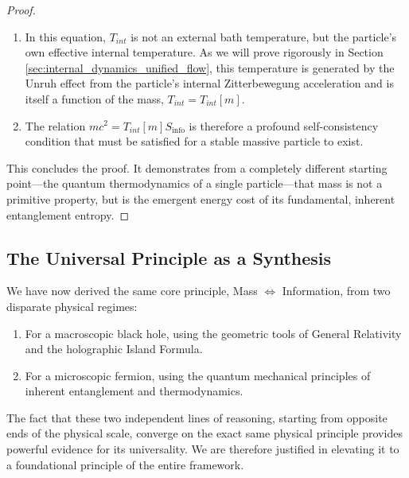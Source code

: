 \documentclass[11pt, letterpaper]{report}
\theoremstyle{plain} %
\theoremstyle{definition} %
\theoremstyle{remark} %
\begin{document}
\begin{proof}
\begin{enumerate}
    \item In this equation, $T_{int}$ is not an external bath temperature, but the particle's own effective internal temperature. As we will prove rigorously in Section \ref{sec:internal_dynamics_unified_flow}, this temperature is generated by the Unruh effect from the particle's internal Zitterbewegung acceleration and is itself a function of the mass, $T_{int} = T_{int}[m]$.
    \item The relation $mc^2 = T_{int}[m] S_{\text{info}}$ is therefore a profound self-consistency condition that must be satisfied for a stable massive particle to exist.
\end{enumerate}
This concludes the proof. It demonstrates from a completely different starting point—the quantum thermodynamics of a single particle—that mass is not a primitive property, but is the emergent energy cost of its fundamental, inherent entanglement entropy.
\end{proof}

\subsection{The Universal Principle as a Synthesis}
\label{subsec:universal_principle_synthesis}

We have now derived the same core principle, Mass $\Leftrightarrow$ Information, from two disparate physical regimes:
\begin{enumerate}
    \item For a macroscopic black hole, using the geometric tools of General Relativity and the holographic Island Formula.
    \item For a microscopic fermion, using the quantum mechanical principles of inherent entanglement and thermodynamics.
\end{enumerate}
The fact that these two independent lines of reasoning, starting from opposite ends of the physical scale, converge on the exact same physical principle provides powerful evidence for its universality. We are therefore justified in elevating it to a foundational principle of the entire framework.
\end{document}
